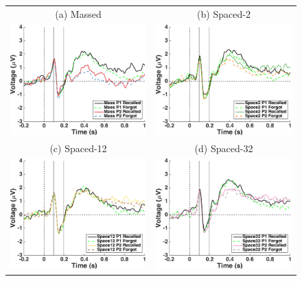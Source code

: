 
\begin{figure}[hp]
  \centering
  \begin{tabular}{cc}
  \multicolumn{1}{c}{(a) Massed} & \multicolumn{1}{c}{(b) Spaced-2} \\
  \includegraphics[width=.35\textwidth]{./figs/exp2/tla_single_ga_word_rc_mass_p1_word_fo_mass_p1_word_rc_mass_p2_word_fo_mass_p2_E50_E51_E57_E58_E59_E64_E65_-200_1000_legend_xylabel} &
  \includegraphics[width=.35\textwidth]{./figs/exp2/tla_single_ga_word_rc_spac2_p1_word_fo_spac2_p1_word_rc_spac2_p2_word_fo_spac2_p2_E50_E51_E57_E58_E59_E64_E65_-200_1000_legend_xylabel} \\
  \multicolumn{1}{c}{(c) Spaced-12} & \multicolumn{1}{c}{(d) Spaced-32} \\
  \includegraphics[width=.35\textwidth]{./figs/exp2/tla_single_ga_word_rc_spac12_p1_word_fo_spac12_p1_word_rc_spac12_p2_word_fo_spac12_p2_E50_E51_E57_E58_E59_E64_E65_-200_1000_legend_xylabel} &
  \includegraphics[width=.35\textwidth]{./figs/exp2/tla_single_ga_word_rc_spac32_p1_word_fo_spac32_p1_word_rc_spac32_p2_word_fo_spac32_p2_E50_E51_E57_E58_E59_E64_E65_-200_1000_legend_xylabel} \\

\end{tabular}
\end{figure}
